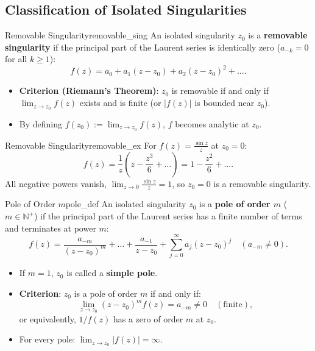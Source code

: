 \subsection{Classification of Isolated Singularities}

\begin{definition}{Removable Singularity}{removable_sing}
An isolated singularity $z_0$ is a \textbf{removable singularity} if the principal part of the Laurent series is identically zero ($a_{-k} = 0$ for all $k \ge 1$):
\begin{equation}
f(z) = a_0 + a_1(z - z_0) + a_2(z - z_0)^2 + \dots.
\end{equation}
\begin{itemize}
    \item \textbf{Criterion (Riemann's Theorem)}: $z_0$ is removable if and only if $\lim_{z \to z_0} f(z)$ exists and is finite (or $|f(z)|$ is bounded near $z_0$).
    \item By defining $f(z_0) := \lim_{z \to z_0} f(z)$, $f$ becomes analytic at $z_0$.
\end{itemize}
\end{definition}

\begin{example}{Removable Singularity}{removable_ex}
For $f(z) = \frac{\sin z}{z}$ at $z_0 = 0$:
\begin{equation}
f(z) = \frac{1}{z}\left(z - \frac{z^3}{6} + \dots\right) = 1 - \frac{z^2}{6} + \dots.
\end{equation}
All negative powers vanish, $\lim_{z \to 0} \frac{\sin z}{z} = 1$, so $z_0 = 0$ is a removable singularity.
\end{example}

\begin{definition}{Pole of Order $m$}{pole_def}
An isolated singularity $z_0$ is a \textbf{pole of order $m$} ($m \in \mathbb{N}^+$) if the principal part of the Laurent series has a finite number of terms and terminates at power $m$:
\begin{equation}
f(z) = \frac{a_{-m}}{(z - z_0)^m} + \dots + \frac{a_{-1}}{z - z_0} + \sum_{j=0}^\infty a_j (z - z_0)^j \quad (a_{-m} \neq 0).
\end{equation}
\begin{itemize}
    \item If $m = 1$, $z_0$ is called a \textbf{simple pole}.
    \item \textbf{Criterion}: $z_0$ is a pole of order $m$ if and only if:
    \begin{equation}
    \lim_{z \to z_0} (z - z_0)^m f(z) = a_{-m} \neq 0 \quad (\text{finite}),
    \end{equation}
    or equivalently, $1/f(z)$ has a zero of order $m$ at $z_0$.
    \item For every pole: $\lim_{z \to z_0} |f(z)| = \infty$.
\end{itemize}
\end{definition}

